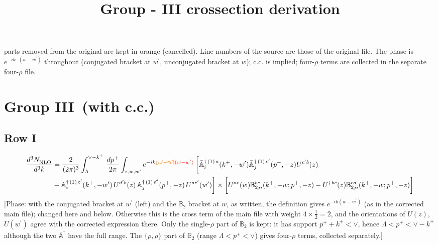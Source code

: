 \documentclass[9pt]{article}
\title{Group - III crossection derivation}
\author{}
\date{}
\def\mf#1{\mathbb{#1}}
\numberwithin{equation}{section}
\begin{document}
\maketitle {} {\color{orange}parts removed from the original are kept in orange (cancelled).} {\color{red}Line numbers of the source are those of the original file. The phase is $e^{-ik\cdot(w-w^{\prime})}$ throughout (conjugated bracket at $w^{\prime}$, unconjugated bracket at $w$); c.c. is implied; four-$\rho$ terms are collected in the separate four-$\rho$ file.}\par
\section{Group III\, (with c.c.)}
\subsection{Row I\, }
\begin{align}
 \frac{d^{3}N_{\rm NLO}^{\rm}}{d^{3}k}  & =    \frac{2}{(2\pi)^{3}} \int_{\Lambda}^{\vee - k^{+}}\, \frac{dp^{+}}{2\pi}\int_{z,w,w^{\prime}} e^{-ik{\color{orange}\cancel{(w^{\prime}-w)}}{\color{red}(w-w^{\prime})}}\, 
        \bigg[\Bar{\mf{A}}^{\dagger\, (1)\, a}_{i}(k^{+},-w^{\prime})\Bar{\mf{A}}^{\dagger\, (1)\, c^{\prime}}_{j}(p^{+},-z)U^{c^{\prime}b}(z)\notag \\ & -\mf{A}^{\dagger\, (1)\, c^{\prime}}_{i}(k^{+},- w^{\prime})\,U^{d^{\prime}b}(z)\,\Bar{\mf{A}}^{\dagger\, (1)\, d^{\prime}}_{j}(p^{+},-z)\,U^{ac^{\prime}}(w^{\prime})  \bigg]\times \bigg[U^{ac}(w) \mf{B}^{bc}_{2ji}(k^{+},-w;p^{+},-z) -U^{\dagger\, bc}(z)\Bar{\mf{B}}^{ca}_{2ji}(k^{+},-w; p^{+},-z)\bigg] \nonumber
\end{align} {\color{red}[Phase: with the conjugated bracket at $w^{\prime}$ (left) and the $\mf{B}_{2}$ bracket at $w$, as written, the definition gives $e^{-ik(w-w^{\prime})}$ (as in the corrected main file); changed here and below. Otherwise this is the cross term of the main file with weight $4\times\frac{1}{2}=2$, and the orientations of $U(z)$, $U(w^{\prime})$ agree with the corrected expression there. Only the single-$\rho$ part of $\mf{B}_{2}$ is kept: it has support $p^{+}+k^{+}<\vee$, hence $\Lambda<p^{+}<\vee-k^{+}$ although the two $\bar{\mf{A}}^{\dagger}$ have the full range. The $\{\rho,\rho\}$ part of $\mf{B}_{2}$ (range $\Lambda<p^{+}<\vee$) gives four-$\rho$ terms, collected separately.]}\par\noindent 
\end{document}
